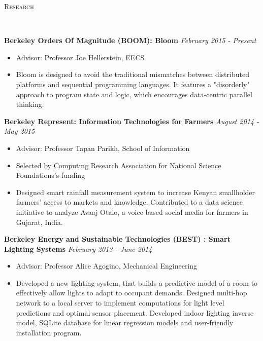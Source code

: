 \documentclass[9pt]{extarticle}
\newenvironment{changemargin}[2]{%
  \begin{list}{}{%
    \setlength{\topsep}{0pt}%
    \setlength{\leftmargin}{#1}%
    \setlength{\rightmargin}{#2}%
    \setlength{\listparindent}{\parindent}%
    \setlength{\itemindent}{\parindent}%
    \setlength{\parsep}{\parskip}%
  }%
  \item[]}{\end{list}
}
\newcommand{\lineover}{
	\begin{changemargin}{-0.05in}{-0.05in}
		\vspace*{-8pt}
		\hrulefill \\
		\vspace*{-2pt}
	\end{changemargin}
}
\newcommand{\header}[1]{
    \vspace{5pt}
	\begin{changemargin}{-0.5in}{-0.5in}
		\scshape{#1}\\
  	\lineover
	\end{changemargin}
	\vspace{5pt}
}
\newenvironment{body} {
	\vspace*{-9pt}
	\begin{changemargin}{-0.5in}{-0.5in}
  }	
	{\end{changemargin}
}
\begin{document}
\vspace*{-2pt}
\header{Research}
\begin{body}

\textbf {Berkeley Orders Of Magnitude (BOOM): Bloom} 
\hfill \emph{February 2015 - Present}
\vspace*{-4pt}
\begin{itemize}
	\itemsep -2pt
	\item[] Advisor: Professor Joe Hellerstein, EECS 
	\item[] Bloom is designed to avoid the traditional mismatches between distributed platforms and sequential programming languages. It features a "disorderly" approach to program state and logic, which encourages data-centric parallel thinking. 
	\end{itemize}

\textbf {Berkeley Represent: Information Technologies for Farmers} 
\hfill \emph{August 2014 - May 2015}
\vspace*{-4pt}
\begin{itemize}
	\itemsep -2pt
	\item[] Advisor: Professor Tapan Parikh, School of Information
	\item[] Selected by Computing Research Association for National Science Foundations's funding
	\item[] Designed smart rainfall measurement system to increase Kenyan smallholder farmers' access to markets and knowledge. Contributed to a data science initiative to analyze Avaaj Otalo, a voice based social media for farmers in Gujarat, India. 
\end{itemize}

\textbf{Berkeley Energy and Sustainable Technologies (BEST) : Smart Lighting Systems}
 \hfill \emph{February 2013  - June 2014}\\
	\vspace*{-4pt}	
	\begin{itemize} \itemsep -0pt  %
	\itemsep -2pt
	\item[] Advisor: Professor Alice Agogino, Mechanical Engineering
		\item[] Developed a new lighting system, that builds a predictive model of a room to effectively allow lights to adapt to occupant demands. Designed multi-hop network to a local server to implement computations for light level predictions and optimal sensor placement. Developed indoor lighting inverse model, SQLite database for linear regression models and user-friendly installation program.
		\end{itemize}
\end{body}
\end{document}
